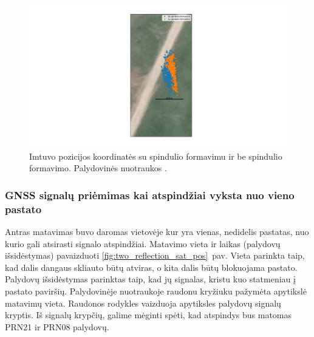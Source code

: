 \documentclass[main.tex]{subfiles}
\begin{document}
\begin{figure}[ht]
    \begin{centering}
    \hspace*{-3cm}\includegraphics[scale=0.45]{drawings/no_reflection_map}
    \par\end{centering}
    \protect\caption{\label{fig:no_reflection_map}Imtuvo pozicijos koordinatės su spindulio formavimu ir be spindulio formavimo. Palydovinės nuotraukos \cite{google_maps}.}
\end{figure}



\subsubsection{GNSS signalų priėmimas kai atspindžiai vyksta nuo vieno pastato}\label{sec:gnss_meas_one_reflection}

Antras matavimas buvo daromas vietovėje kur yra vienas, nedidelis pastatas, nuo kurio gali atsirasti
signalo atspindžiai. Matavimo vieta ir laikas (palydovų išsidėstymas) pavaizduoti \ref{fig:two_reflection_sat_pos}~pav.
Vieta parinkta taip, kad dalis dangaus skliauto būtų atviras, o kita dalis būtų blokuojama pastato.
Palydovų išsidėstymas parinktas taip, kad jų signalas, kristu kuo statmeniau į pastato paviršių.
Palydovinėje nuotraukoje raudonu kryžiuku pažymėta apytikslė matavimų vieta. Raudonos rodykles
vaizduoja apytiksles palydovų signalų kryptis. Iš signalų krypčių, galime mėginti spėti,
kad atspindys bus matomas PRN21 ir PRN08 palydovų.
\end{document}
